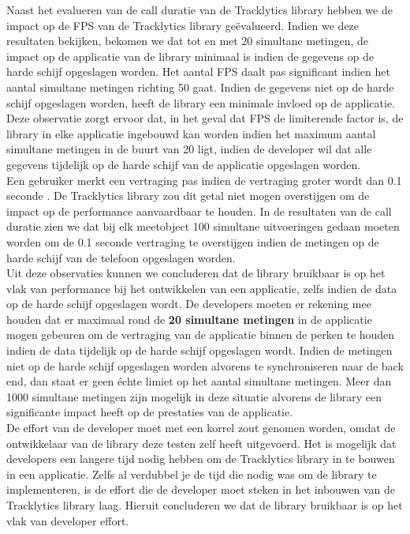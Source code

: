 Naast het evalueren van de call duratie van de Tracklytics library hebben we de impact op de FPS van de Tracklytics library ge\"evalueerd. Indien we deze resultaten bekijken, bekomen we dat tot en met 20 simultane metingen, de impact op de applicatie van de library minimaal is indien de gegevens op de harde schijf opgeslagen worden. Het aantal FPS daalt pas significant indien het aantal simultane metingen richting 50 gaat. Indien de gegevens niet op de harde schijf opgeslagen worden, heeft de library een minimale invloed op de applicatie. Deze observatie zorgt ervoor dat, in het geval dat FPS de limiterende factor is, de library in elke applicatie ingebouwd kan worden indien het maximum aantal simultane metingen in de buurt van 20 ligt, indien de developer wil dat alle gegevens tijdelijk op de harde schijf van de applicatie opgeslagen worden. \\ 

Een gebruiker merkt een vertraging pas indien de vertraging groter wordt dan 0.1 seconde \cite{nielsen1994usability}. De Tracklytics library zou dit getal niet mogen overstijgen om de impact op de performance aanvaardbaar te houden. In de resultaten van de call duratie zien we dat bij elk meetobject 100 simultane uitvoeringen gedaan moeten worden om de 0.1 seconde vertraging te overstijgen indien de metingen op de harde schijf van de telefoon opgeslagen worden. \\


Uit deze observaties kunnen we concluderen dat de library bruikbaar is op het vlak van performance bij het ontwikkelen van een applicatie, zelfs indien de data op de harde schijf opgeslagen wordt. De developers moeten er rekening mee houden dat er maximaal rond de \textbf{20 simultane metingen} in de applicatie mogen gebeuren om de vertraging van de applicatie binnen de perken te houden indien de data tijdelijk op de harde schijf opgeslagen wordt. Indien de metingen niet op de harde schijf opgeslagen worden alvorens te synchroniseren naar de back end, dan staat er geen \'echte limiet op het aantal simultane metingen. Meer dan 1000 simultane metingen zijn mogelijk in deze situatie alvorens de library een significante impact heeft op de prestaties van de applicatie. \\

De effort van de developer moet met een korrel zout genomen worden, omdat de ontwikkelaar van de library deze testen zelf heeft uitgevoerd. Het is mogelijk dat developers een langere tijd nodig hebben om de Tracklytics library in te bouwen in een applicatie. Zelfs al verdubbel je de tijd die nodig was om de library te implementeren, is de effort die de developer moet steken in het inbouwen van de Tracklytics library laag. Hieruit concluderen we dat de library bruikbaar is op het vlak van developer effort. \\



